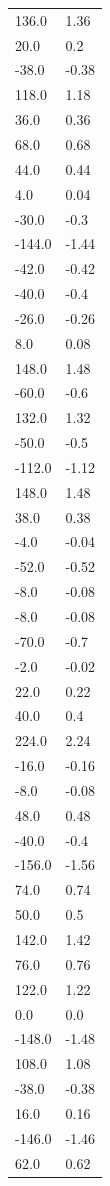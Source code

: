 \begin{longtable}{ll}
136.0 & 1.36 \\
20.0 & 0.2 \\
-38.0 & -0.38 \\
118.0 & 1.18 \\
36.0 & 0.36 \\
68.0 & 0.68 \\
44.0 & 0.44 \\
4.0 & 0.04 \\
-30.0 & -0.3 \\
-144.0 & -1.44 \\
-42.0 & -0.42 \\
-40.0 & -0.4 \\
-26.0 & -0.26 \\
8.0 & 0.08 \\
148.0 & 1.48 \\
-60.0 & -0.6 \\
132.0 & 1.32 \\
-50.0 & -0.5 \\
-112.0 & -1.12 \\
148.0 & 1.48 \\
38.0 & 0.38 \\
-4.0 & -0.04 \\
-52.0 & -0.52 \\
-8.0 & -0.08 \\
-8.0 & -0.08 \\
-70.0 & -0.7 \\
-2.0 & -0.02 \\
22.0 & 0.22 \\
40.0 & 0.4 \\
224.0 & 2.24 \\
-16.0 & -0.16 \\
-8.0 & -0.08 \\
48.0 & 0.48 \\
-40.0 & -0.4 \\
-156.0 & -1.56 \\
74.0 & 0.74 \\
50.0 & 0.5 \\
142.0 & 1.42 \\
76.0 & 0.76 \\
122.0 & 1.22 \\
0.0 & 0.0 \\
-148.0 & -1.48 \\
108.0 & 1.08 \\
-38.0 & -0.38 \\
16.0 & 0.16 \\
-146.0 & -1.46 \\
62.0 & 0.62 \\

\end{longtable}
